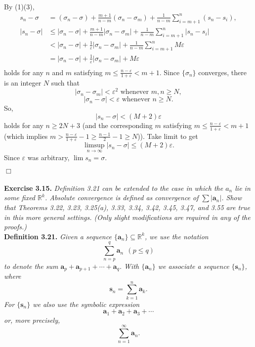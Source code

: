 \documentclass{article}
\begin{document}
\begin{enumerate}
By (1)(3),
  \begin{align*}
  s_n - \sigma
  &=
  (\sigma_n - \sigma)
    + \frac{m+1}{n-m}(\sigma_n - \sigma_m)
    + \frac{1}{n-m}\sum_{i=m+1}^{n}(s_n - s_i), \\
  |s_n - \sigma|
  &\leq
  |\sigma_n - \sigma|
    + \frac{m+1}{n-m}|\sigma_n - \sigma_m|
    + \frac{1}{n-m}\sum_{i=m+1}^{n}|s_n - s_i| \\
  &<
  |\sigma_n - \sigma|
    + \frac{1}{\varepsilon} |\sigma_n - \sigma_m|
    + \frac{1}{n-m}\sum_{i=m+1}^{n} M\varepsilon \\
  &=
  |\sigma_n - \sigma|
    + \frac{1}{\varepsilon} |\sigma_n - \sigma_m|
    + M\varepsilon \\
  \end{align*}
holds for any $n$ and $m$ satisfying
$m \leq \frac{n-\varepsilon}{1+\varepsilon} < m+1.$
Since $\{ \sigma_n \}$ converges,
there is an integer $N$ such that
$$|\sigma_n - \sigma_m| < \varepsilon^2 \text{ whenever } m,n \geq N,$$
$$|\sigma_n - \sigma| < \varepsilon \text{ whenever } n \geq N.$$
So,
$$|s_n - \sigma| < (M+2) \varepsilon$$
holds for any $n \geq 2N+3$ (and the corresponding $m$
satisfying $m \leq \frac{n-\varepsilon}{1+\varepsilon} < m+1$
(which implies $m > \frac{n-\varepsilon}{1+\varepsilon} - 1
\geq \frac{n-1}{2} - 1 \geq N$)).
Take limit to get
$$\limsup_{n \to \infty} |s_n - \sigma| \leq (M+2) \varepsilon.$$
Since $\varepsilon$ was arbitrary, $\lim s_n = \sigma$.
\end{enumerate}
$\Box$ \\\\






\textbf{Exercise 3.15.}
\emph{Definition 3.21 can be extended to the case in which the $a_n$
lie in some fixed $\mathbb{R}^k$.
Absolute convergence is defined as convergence of $\sum |\mathbf{a}_n|$.
Show that Theorems 3.22, 3.23, 3.25(a), 3.33, 3.34, 3.42, 3.45, 3.47, and 3.55 are true
in this more general settings.
(Only slight modifications are required in any of the proofs.)} \\

\textbf{Definition 3.21.}
\emph{Given a sequence $\{ \mathbf{a}_n \} \subseteq \mathbb{R}^k$,
we use the notation
$$\sum_{n=p}^{q} \mathbf{a}_n \:\: (p \leq q)$$
to denote the sum
$\mathbf{a}_p + \mathbf{a}_{p+1} + \cdots + \mathbf{a}_q$.
With $\{ \mathbf{a}_n \}$ we associate a sequence $\{ \mathbf{s}_n \}$, where
$$\mathbf{s}_n = \sum_{k=1}^{n} \mathbf{a}_k.$$
For $\{ \mathbf{s}_n \}$ we also use the symbolic expression
$$\mathbf{a}_1 + \mathbf{a}_2 + \mathbf{a}_3 + \cdots$$
or, more precisely,
\[
  \sum_{n=1}^{\infty} \mathbf{a}_n. \tag{4}
\]} \\
\end{document}
